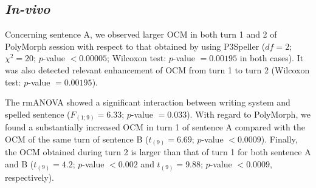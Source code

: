 

\subsection{\emph{In-vivo}}\label{sec:results:invivo}





\vivoerrorseltable







Concerning sentence A, we observed larger OCM in both turn 1 and 2 of PolyMorph session with respect to that obtained by using P3Speller 
($df = 2$; $\chi^2 = 20$; $p$-value $< 0.00005$; Wilcoxon test: $p$-value $=0.00195$ in both cases).
It was also detected 
relevant enhancement of OCM from turn 1 to turn 2 (Wilcoxon test: $p$-value $= 0.00195$). 

The rmANOVA showed a significant interaction between writing system and spelled sentence ($F_{(1; 9)} = 6.33$; $p$-value $= 0.033$). 
With regard to PolyMorph, we found a substantially increased OCM in turn 1 of sentence A compared with the OCM of the same turn of sentence B  
($t_{(9)} = 6.69$; $p$-value $<0.0009$). 
Finally, the OCM obtained during turn 2 is larger than that of turn 1 for both sentence A and B 
($t_{(9)} = 4.2$; $p$-value $<0.002$ and $t_{(9)} = 9.88$; $p$-value $<0.0009$, respectively). 



\vivoOCMtable

